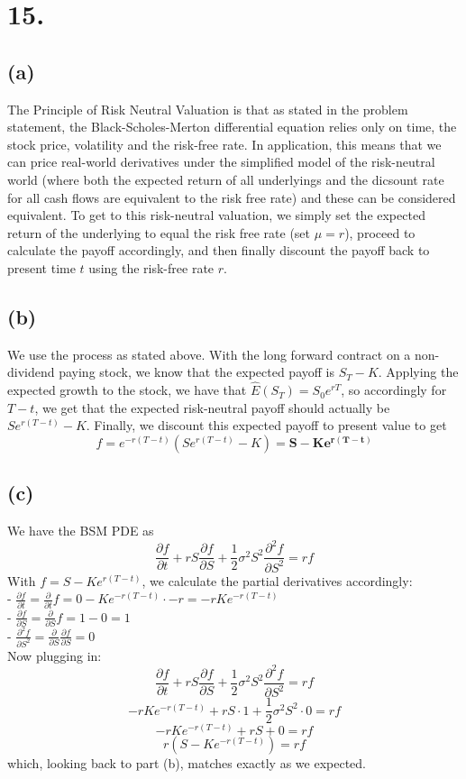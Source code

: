 \documentclass{article}
\begin{document}
{\Large 

\section*{15.}

\subsection*{(a)}

The Principle of Risk Neutral Valuation is that as stated in the problem statement, the Black-Scholes-Merton differential equation relies only on time, the stock price, volatility and the risk-free rate. In application, this means that we can price real-world derivatives under the simplified model of the risk-neutral world (where both the expected return of all underlyings and the dicsount rate for all cash flows are equivalent to the risk free rate) and these can be considered equivalent. To get to this risk-neutral valuation, we simply set the expected return of the underlying to equal the risk free rate (set \(\mu = r\)), proceed to calculate the payoff accordingly, and then finally discount the payoff back to present time \(t\) using the risk-free rate \(r\). 

\subsection*{(b)}
We use the process as stated above. With the long forward contract on a non-dividend paying stock, we know that the expected payoff is \(S_T - K\). Applying the expected growth to the stock, we have that \(\hat{E}(S_T) = S_0 e^{rT} \), so accordingly for \(T - t\), we get that the expected risk-neutral payoff should actually be \(S e^{r (T - t)} - K\). Finally, we discount this expected payoff to present value to get
\[
  f = e^{-r(T - t)} (S e^{r(T - t)} - K) = \boxed{\mathbf{S - K e^{r(T - t)}}}
\]

\subsection*{(c)}
We have the BSM PDE as 
\[
  \frac{\partial f}{\partial t} + r S \frac{\partial f}{\partial S} + \frac{1}{2} \sigma^2 S^2 \frac{\partial^2 f}{\partial S^2} = rf
\]
With \(f = S - K e^{r(T - t)}\), we calculate the partial derivatives accordingly: \\
- \(\frac{\partial f}{\partial t} = \frac{\partial}{\partial t} f = 0 - Ke^{-r(T-t)} \cdot -r = -r K e^{-r(T - t)} \)  \\
- \(\frac{\partial f}{\partial S} = \frac{\partial}{\partial S} f = 1 - 0 = 1\) \\
- \(\frac{\partial^2 f}{\partial S^2} = \frac{\partial}{\partial S} \frac{\partial f}{\partial S} = 0 \) \\
Now plugging in: 
\[
  \frac{\partial f}{\partial t} + r S \frac{\partial f}{\partial S} + \frac{1}{2} \sigma^2 S^2 \frac{\partial^2 f}{\partial S^2} = rf
\]
\[
  -r K e^{-r(T - t)} + r S \cdot 1 + \frac{1}{2} \sigma^2 S^2 \cdot 0 = rf
\]
\[
  -r K e^{-r(T - t)} + r S + 0 = rf
\]
\[
  r(S - K e^{-r(T - t)}) = rf
\]
which, looking back to part (b), matches exactly as we expected. 

}
\end{document}
